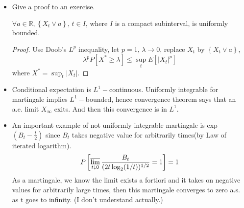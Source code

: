 \begin{itemize}
\item Give a proof to an exercise.
\begin{proposition}
	$\forall a \in \mathbb{R},\left\{X_{t} \vee a\right\}, \,t \in I$, where $I$ is a compact subinterval, is uniformly bounded.
\end{proposition}
\begin{proof}
	Use Doob's $ L^p $ inequality, let $ p=1,\, \lambda\rightarrow 0 $, replace $ X_t $ by $ \left\{X_{t} \vee a\right\} $,
	\[ \lambda^{p} P\left[X^{*} \geq \lambda\right] \leq \sup _{t} E\left[\left|X_{t}\right|^{p}\right] \]
	where $ X^* = \sup_t \lvert X_t \rvert $.
\end{proof}
\item Conditional expectation is $ L^1 - $continuous. Uniformly integrable for martingale implies $ L^1 - $bounded, hence convergence theorem says that an a.e. limit $ X_\infty $ exits. And then this convergence is in $ L^1 $.
\item An important example of not uniformly integrable martingale is exp$(B_t -\frac{t}{2}) $ since $ B_t $ takes negative value for arbitrarily times(by Law of iterated logarithm).
\[ P \left[\varlimsup_{t\downarrow 0} \frac{B_t}{(2t \log_2(1/t))^{1/2}}=1\right] =1 \]
As a martingale, we know the limit exists a fortiori  and it takes on negative values for arbitrarily large times, then this martingale converges to zero a.s. as t goes to infinity. (I don't understand actually.)
\end{itemize}

